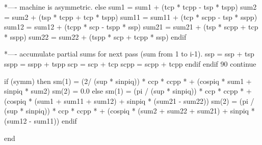 *---- machine is asymmetric.
            else
              sum1 = sum1 + (tcp * tcpp - tsp * tspp)
              sum2 = sum2 + (tsp * tcpp + tcp * tspp)
              sum11 = sum11 + (tcp * scpp - tsp * sspp)
              sum12 = sum12 + (tcpp * scp - tspp * ssp)
              sum21 = sum21 + (tsp * scpp + tcp * sspp)
              sum22 = sum22 + (tspp * scp + tcpp * ssp)
            endif
 
*---- accumulate partial sums for next pass (sum from 1 to i-1).
            ssp  = ssp  + tsp
            sspp = sspp + tspp
            scp  = scp  + tcp
            scpp = scpp + tcpp
          endif
        endif
   90 continue
 
      if (symm) then
        sm(1) = (2\pi / (sup * sinpiq)) * ccp * ccpp *
     +          (cospiq * sum1 + sinpiq * sum2)
        sm(2) = 0.0
      else
        sm(1) = (pi / (sup * sinpiq)) * ccp * ccpp *
     +    (cospiq * (sum1 + sum11 + sum12) + sinpiq * (sum21 - sum22))
        sm(2) = (pi / (sup * sinpiq)) * ccp * ccpp *
     +    (cospiq * (sum2 + sum22 + sum21) + sinpiq * (sum12 - sum11))
      endif
 
      end
\fi
 
 
